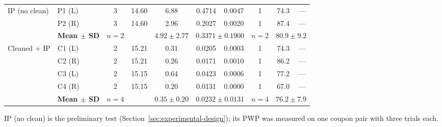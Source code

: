 \begin{table}[htbp]
{\begin{tabular}{llcccccccc}
    \midrule
    IP (no clean) & P1 (L) & 3 & 14.60 & 6.88 & 0.4714 & 0.0047 & 1 & 74.3 & --- \\
     & P2 (R) & 3 & 14.60 & 2.96 & 0.2027 & 0.0020 & 1 & 87.4 & --- \\
    \addlinespace[1pt]
    & \textbf{Mean $\pm$ SD} & $n=2$ & & $\boldsymbol{4.92 \pm 2.77}$ & \multicolumn{2}{c}{$\boldsymbol{0.3371 \pm 0.1900}$} & $n=2$ & \multicolumn{2}{c}{$\boldsymbol{80.9 \pm 9.2}$} \\
    \midrule
    Cleaned + IP & C1 (L) & 2 & 15.21 & 0.31 & 0.0205 & 0.0003 & 1 & 74.3 & --- \\
     & C2 (R) & 2 & 15.21 & 0.26 & 0.0171 & 0.0010 & 1 & 86.2 & --- \\
     & C3 (L) & 2 & 15.15 & 0.64 & 0.0423 & 0.0006 & 1 & 77.2 & --- \\
     & C4 (R) & 2 & 15.15 & 0.20 & 0.0131 & 0.0000 & 1 & 67.0 & --- \\
    \addlinespace[1pt]
    & \textbf{Mean $\pm$ SD} & $n=4$ & & $\boldsymbol{0.35 \pm 0.20}$ & \multicolumn{2}{c}{$\boldsymbol{0.0232 \pm 0.0131}$} & $n=4$ & \multicolumn{2}{c}{$\boldsymbol{76.2 \pm 7.9}$} \\
    \bottomrule
  \end{tabular}}
  \par\smallskip
  \parbox{\linewidth}{\footnotesize IP (no clean) is the preliminary test (Section~\ref{sec:experimental-design}); its PWP was measured on one coupon pair with three trials each.}
\end{table}

